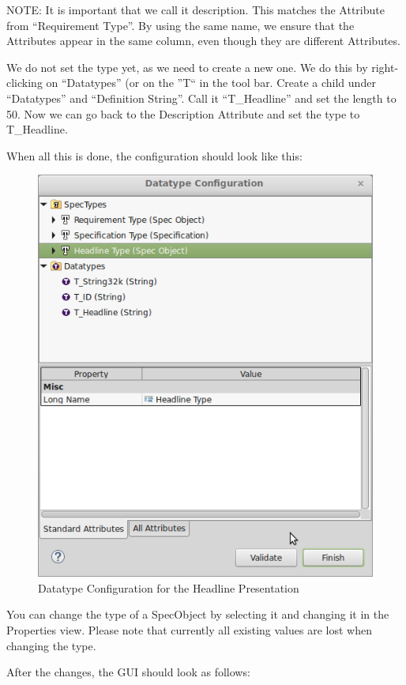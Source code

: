NOTE: It is important that we call it description.  This matches the Attribute from ``Requirement Type''.  By using the same name, we ensure that the Attributes appear in the same column, even though they are different Attributes.

We do not set the type yet, as we need to create a new one.  We do this by right-clicking on ``Datatypes'' (or on the ''T`` in the tool bar.  Create a child under ``Datatypes'' and  ``Definition String''.  Call it ``T\_Headline'' and set the length to 50.  Now we can go back to the Description Attribute and set the type to T\_Headline.

When all this is done, the configuration should look like this:

\begin{figure}[H]
\centering      
\includegraphics[width=0.8\linewidth]{../rmf-images/datatype_Headline_desc.png}      
\caption{Datatype Configuration for the Headline Presentation}      
\label{fig:headlineConfig}
\end{figure}

You can change the type of a SpecObject by selecting it and changing it in the Properties view.  Please note that currently all existing values are lost when changing the type.

After the changes, the GUI should look as follows:

